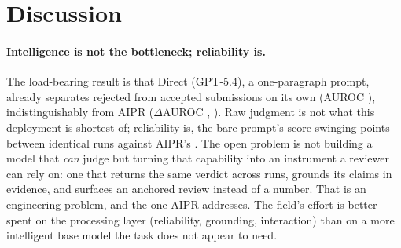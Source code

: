 \section{Discussion}
\label{sec:discussion}

\paragraph{Intelligence is not the bottleneck; reliability is.}
The load-bearing result is that Direct (GPT-5.4), a one-paragraph prompt, already
separates rejected from accepted submissions on its own (AUROC \aurocNaiveFull),
indistinguishably from AIPR ($\Delta$AUROC \aurocDiffFullNaive, \aurocDiffPrel). Raw
judgment is not what this deployment is shortest of; reliability is, the bare prompt's
score swinging \naiveRunSD{} points between identical runs against AIPR's \fullRunSD{}.
The open problem is not building a model that \emph{can} judge but turning that
capability into an instrument a reviewer can rely on: one that returns the same verdict
across runs, grounds its claims in evidence, and surfaces an anchored review instead of a
number. That is an engineering problem, and the one AIPR addresses. The field's effort is
better spent on the processing layer (reliability, grounding, interaction) than on a more
intelligent base model the task does not appear to need.


